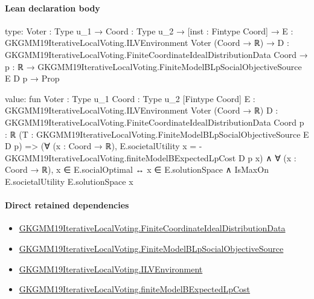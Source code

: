 \documentclass[10pt]{article}
\begin{document}
\paragraph{Lean declaration body}
\begin{ReviewVerbatim}
type:
{Voter : Type u_1} →
  {Coord : Type u_2} →
    [inst : Fintype Coord] →
      {E : GKGMM19IterativeLocalVoting.ILVEnvironment Voter (Coord → ℝ)} →
        {D : GKGMM19IterativeLocalVoting.FiniteCoordinateIdealDistributionData Coord} →
          {p : ℝ} → GKGMM19IterativeLocalVoting.FiniteModelBLpSocialObjectiveSource E D p → Prop

value:
fun {Voter : Type u_1} {Coord : Type u_2} [Fintype Coord]
    {E : GKGMM19IterativeLocalVoting.ILVEnvironment Voter (Coord → ℝ)}
    {D : GKGMM19IterativeLocalVoting.FiniteCoordinateIdealDistributionData Coord} {p : ℝ}
    (T : GKGMM19IterativeLocalVoting.FiniteModelBLpSocialObjectiveSource E D p) =>
  (∀ (x : Coord → ℝ), E.societalUtility x = -GKGMM19IterativeLocalVoting.finiteModelBExpectedLpCost D p x) ∧
    ∀ (x : Coord → ℝ), x ∈ E.socialOptimal ↔ x ∈ E.solutionSpace ∧ IsMaxOn E.societalUtility E.solutionSpace x
\end{ReviewVerbatim}

\paragraph{Direct retained dependencies}
\begin{itemize}\raggedright
\item \hyperlink{governing-declaration-57171116eb928bf6}{GKGMM19\allowbreak{}Iterative\allowbreak{}Local\allowbreak{}Voting.\allowbreak{}Finite\allowbreak{}Coordinate\allowbreak{}Ideal\allowbreak{}Distribution\allowbreak{}Data}
\item \hyperlink{governing-declaration-05cf1c1dee9d2a86}{GKGMM19\allowbreak{}Iterative\allowbreak{}Local\allowbreak{}Voting.\allowbreak{}Finite\allowbreak{}Model\allowbreak{}B\allowbreak{}Lp\allowbreak{}Social\allowbreak{}Objective\allowbreak{}Source}
\item \hyperlink{governing-declaration-df2ca62df1846667}{GKGMM19\allowbreak{}Iterative\allowbreak{}Local\allowbreak{}Voting.\allowbreak{}ILV\allowbreak{}Environment}
\item \hyperlink{governing-declaration-7ef42fcd57c269c9}{GKGMM19\allowbreak{}Iterative\allowbreak{}Local\allowbreak{}Voting.\allowbreak{}finite\allowbreak{}Model\allowbreak{}B\allowbreak{}Expected\allowbreak{}Lp\allowbreak{}Cost}
\end{itemize}
\hypertarget{governing-declaration-7910c34249d682bd}{}
\end{document}
